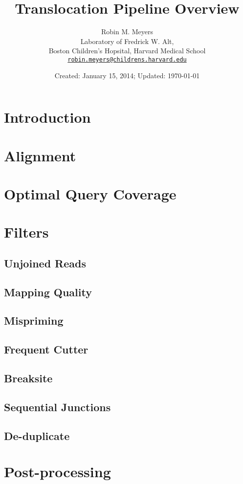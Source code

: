 \documentclass{article}
\begin{document}
\title{Translocation Pipeline Overview}
\author{Robin M. Meyers\\
  Laboratory of Fredrick W. Alt,\\
  Boston Children's Hopsital, Harvard Medical School\\
  \href{mailto:robin.meyers@childrens.harvard.edu}{\texttt{robin.meyers@childrens.harvard.edu}}}
\date{Created: January 15, 2014; Updated: \today}
\maketitle

\begin{abstract}

\end{abstract}


\section{Introduction}

\section{Alignment}

\section{Optimal Query Coverage}

\section{Filters}
\subsection*{Unjoined Reads}

\subsection*{Mapping Quality}

\subsection*{Mispriming}

\subsection*{Frequent Cutter}

\subsection*{Breaksite}

\subsection*{Sequential Junctions}

\subsection*{De-duplicate}

\section{Post-processing}
\end{document}
